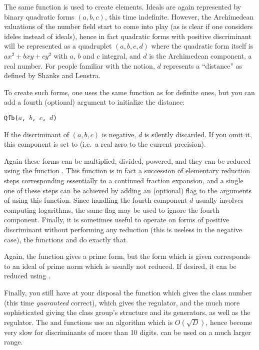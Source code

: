 The same  function is used to create elements. Ideals are again
represented by binary quadratic forms $(a,b,c)$, this time indefinite. However,
the Archimedean valuations of the number field start to come into play (as
is clear if one considers ideles instead of ideals), hence in fact quadratic
forms with positive discriminant will be represented as a quadruplet
$(a,b,c,d)$ where the quadratic form itself is $ax^2+bxy+cy^2$ with $a$,
$b$ and $c$ integral, and $d$ is the Archimedean component, a real number.
For people familiar with the notion, $d$ represents a ``distance'' as defined
by Shanks and Lenstra.

To create such forms, one uses the same function as for definite ones, but
you can add a fourth (optional) argument to initialize the distance:

\centerline{\tt Qfb($a$, $b$, $c$, $d$)}

If the discriminant of $(a,b,c)$ is negative, $d$ is silently
discarded. If you omit it, this component is set to  (i.e.~a real zero
to the current precision).

Again these forms can be multiplied, divided, powered, and they can be
reduced using the function . This function is in fact a
succession of elementary reduction steps corresponding essentially to a
continued fraction expansion, and a single one of these steps can be achieved
by adding an (optional) flag to the arguments of using this function. Since
handling the fourth component $d$ usually involves computing logarithms, the
same flag may be used to ignore the fourth component. Finally, it is
sometimes useful to operate on forms of positive discriminant without
performing any reduction (this is useless in the negative case), the
functions  and  do exactly that.

Again, the function  gives a prime form, but the form which
is given corresponds to an ideal of prime norm which is usually not reduced.
If desired, it can be reduced using .

Finally, you still have at your disposal the function  which
gives the class number (this time \emph{guaranteed} correct),
 which gives the regulator, and the much more sophisticated
 giving the class group's structure and its generators,
as well as the regulator. The  and 
functions use an algorithm which is $O(\sqrt D)$, hence become very slow for
discriminants of more than 10 digits.  can be used on a
much larger range.

